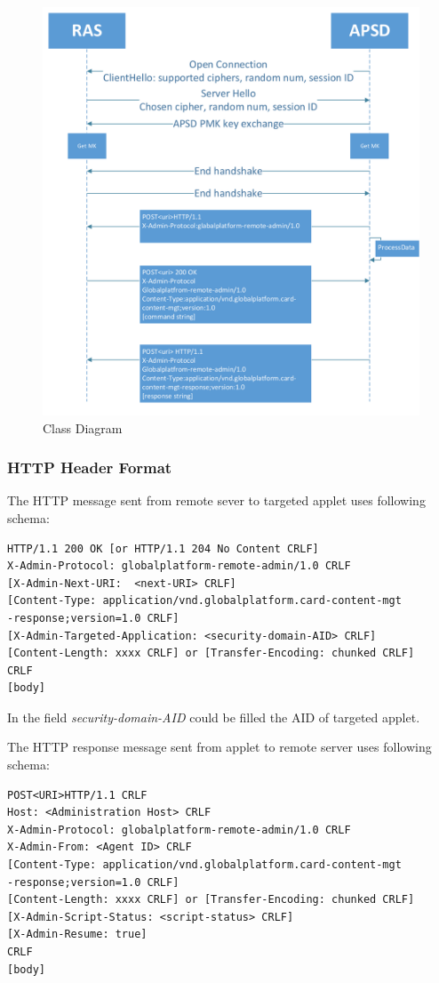 \begin{figure}[!htbp]

	\centering
	\includegraphics[width=1.2\textwidth]{communication-flow}
		\caption{Class Diagram}
	\label{fig:communication-flow}
\end{figure}

\subsubsection{HTTP Header Format}
The HTTP message sent from remote sever to targeted applet uses following schema\cite{gp}:
\begin{verbatim}
HTTP/1.1 200 OK [or HTTP/1.1 204 No Content CRLF]
X-Admin-Protocol: globalplatform-remote-admin/1.0 CRLF
[X-Admin-Next-URI:  <next-URI> CRLF]
[Content-Type: application/vnd.globalplatform.card-content-mgt
-response;version=1.0 CRLF]
[X-Admin-Targeted-Application: <security-domain-AID> CRLF]
[Content-Length: xxxx CRLF] or [Transfer-Encoding: chunked CRLF]
CRLF
[body]
\end{verbatim}
In the field \emph{security-domain-AID} could be filled the AID of targeted applet.


The HTTP response message sent from applet to remote server uses following schema\cite{gp}:
\begin{verbatim}
POST<URI>HTTP/1.1 CRLF
Host: <Administration Host> CRLF
X-Admin-Protocol: globalplatform-remote-admin/1.0 CRLF
X-Admin-From: <Agent ID> CRLF
[Content-Type: application/vnd.globalplatform.card-content-mgt
-response;version=1.0 CRLF]
[Content-Length: xxxx CRLF] or [Transfer-Encoding: chunked CRLF]
[X-Admin-Script-Status: <script-status> CRLF]
[X-Admin-Resume: true]
CRLF
[body]
\end{verbatim}

